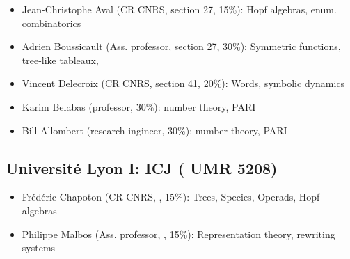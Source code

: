 \begin{itemize}
\item Jean-Christophe Aval (CR CNRS, section 27, 15\%): %
  Hopf algebras, enum. combinatorics%
\item Adrien Boussicault (Ass. professor, section 27, 30\%): %
  Symmetric functions, tree-like tableaux, %
\item Vincent Delecroix (CR CNRS, section 41, 20\%): Words, symbolic dynamics
\item Karim Belabas (professor, 30\%): number theory, PARI
\item Bill Allombert (research ingineer, 30\%): number theory, PARI
\end{itemize}

\vspace{-1.2ex}
\subsection*{Université Lyon I: ICJ (%
  UMR 5208)}
\begin{itemize}
\item Frédéric Chapoton (CR CNRS, \MATH, 15\%): %
  Trees, Species, Operads, Hopf algebras
\item Philippe Malbos (Ass. professor, \MATH, 15\%): %
  Representation theory, %
  rewriting systems%
\end{itemize}



